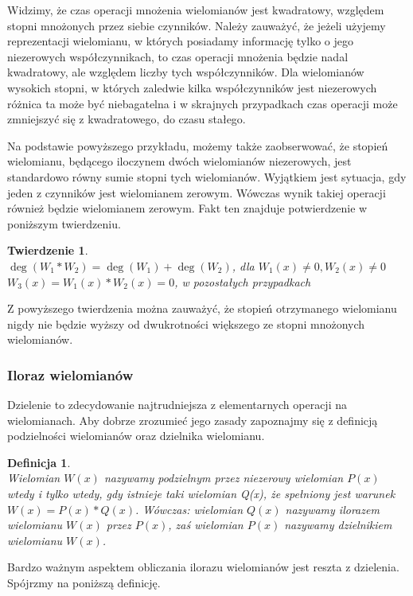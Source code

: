 \documentclass[twoside,a4paper]{book}
\newtheorem{theorem}{Twierdzenie}
\newtheorem{definition}{Definicja}
\begin{document}
Widzimy, że czas operacji mnożenia wielomianów jest kwadratowy, względem stopni mnożonych przez siebie czynników. Należy zauważyć, że jeżeli użyjemy reprezentacji wielomianu, w których posiadamy informację tylko o jego niezerowych współczynnikach, to czas operacji mnożenia będzie nadal kwadratowy, ale względem liczby tych współczynników. Dla wielomianów wysokich stopni, w których zaledwie kilka współczynników jest niezerowych różnica ta może być niebagatelna i w skrajnych przypadkach czas operacji może zmniejszyć się z kwadratowego, do czasu stałego.

Na podstawie powyższego przykładu, możemy także zaobserwować, że stopień wielomianu, będącego iloczynem dwóch wielomianów niezerowych, jest standardowo równy sumie stopni tych wielomianów. Wyjątkiem jest sytuacja, gdy jeden z czynników jest wielomianem zerowym. Wówczas wynik takiej operacji również będzie wielomianem zerowym. Fakt ten znajduje potwierdzenie w poniższym twierdzeniu.

\begin{theorem}
$ $\\
$\deg(W_1 * W_2) = \deg(W_1) + \deg(W_2)$, dla $W_1(x) \neq 0, W_2(x) \neq 0$\\
$W_3(x) = W_1(x) * W_2(x) = 0$, w pozostałych przypadkach
\end{theorem}

Z powyższego twierdzenia można zauważyć, że stopień otrzymanego wielomianu nigdy nie będzie wyższy od dwukrotności większego ze stopni mnożonych wielomianów.

\subsubsection{Iloraz wielomianów}

Dzielenie to zdecydowanie najtrudniejsza z elementarnych operacji na wielomianach. Aby dobrze zrozumieć jego zasady zapoznajmy się z definicją podzielności wielomianów oraz dzielnika wielomianu.

\begin{definition}
	$ $\\
	Wielomian $W(x)$ nazywamy podzielnym przez niezerowy wielomian $P(x)$ wtedy i tylko wtedy, gdy istnieje taki wielomian Q(x), że spełniony jest warunek $W(x) = P(x) * Q(x)$. Wówczas: wielomian $Q(x)$ nazywamy ilorazem wielomianu $W(x)$ przez $P(x)$, zaś wielomian $P(x)$ nazywamy dzielnikiem wielomianu $W(x)$.
\end{definition}

Bardzo ważnym aspektem obliczania ilorazu wielomianów jest reszta z dzielenia. Spójrzmy na poniższą definicję.
\end{document}
